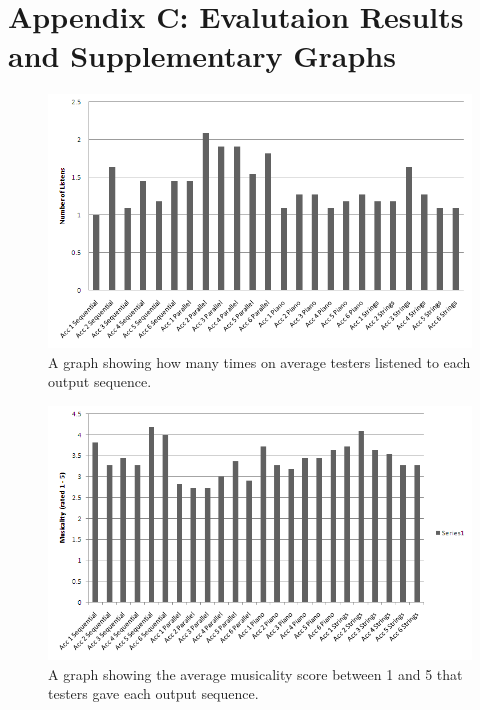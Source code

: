 \section{Appendix C: Evalutaion Results and Supplementary Graphs}

\begin{figure}[ht]
\centering
\includegraphics[scale=0.6]{numberoflistensind}
\caption{A graph showing how many times on average testers listened to each output sequence.}
\label{fig:numberoflistensind}
\end{figure}

\begin{figure}[ht]
\centering
\includegraphics[scale=0.6]{musicalitydetail}
\caption{A graph showing the average musicality score between 1 and 5 that testers gave each output sequence.}
\label{fig:musicalitydetail}
\end{figure}